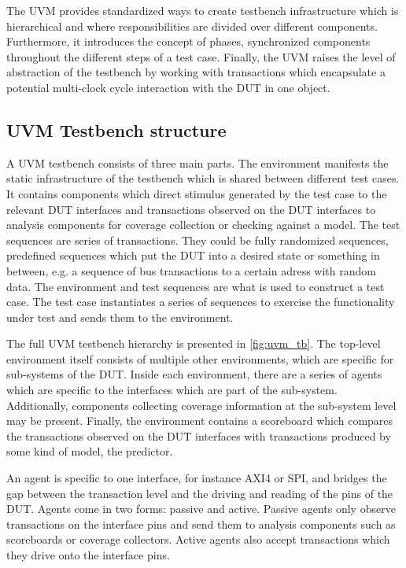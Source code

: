 \documentclass[12pt]{book}
\begin{document}
The UVM provides standardized ways to create testbench infrastructure which is hierarchical and where
responsibilities are divided over different components. Furthermore, it introduces the concept of phases,
synchronized components throughout the different steps of a test case. Finally, the UVM raises the level of
abstraction of the testbench by working with transactions which encapsulate a potential multi-clock cycle interaction
with the DUT in one object.

\subsection{UVM Testbench structure}

A UVM testbench consists of three main parts. The environment manifests the static infrastructure of the testbench
which is shared between different test cases. It contains components which direct stimulus generated by the test case
to the relevant DUT interfaces and transactions observed on the DUT interfaces to analysis components for coverage
collection or checking against a model. The test sequences are series of transactions. They could be fully randomized
sequences, predefined sequences which put the DUT into a desired state or something in between, e.g. a sequence of
bus transactions to a certain adress with random data. The environment and test sequences are what is used to
construct a test case. The test case instantiates a series of sequences to exercise the functionality under test and
sends them to the environment.

The full UVM testbench hierarchy is presented in \ref{fig:uvm_tb}. The top-level environment itself consists of
multiple other environments, which are specific for sub-systems of the DUT. Inside each environment, there are a
series of agents which are specific to the interfaces which are part of the sub-system. Additionally, components
collecting coverage information at the sub-system level may be present. Finally, the environment contains a
scoreboard which compares the transactions observed on the DUT interfaces with transactions produced by some kind of
model, the predictor.

An agent is specific to one interface, for instance AXI4 or SPI, and bridges the gap between the transaction level
and the driving and reading of the pins of the DUT. Agents come in two forms: passive and active. Passive agents only
observe transactions on the interface pins and send them to analysis components such as scoreboards or coverage
collectors. Active agents also accept transactions which they drive onto the interface pins.
\end{document}
